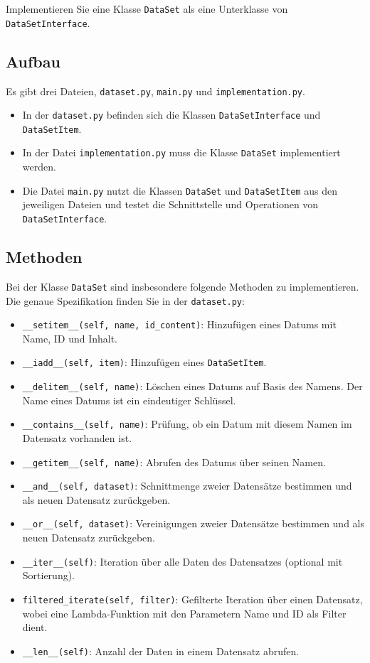 \documentclass[a4paper,12pt]{article}
\begin{document}
Implementieren Sie eine Klasse \texttt{DataSet} als eine Unterklasse von \texttt{DataSetInterface}.

\subsection{Aufbau}
Es gibt drei Dateien, \texttt{dataset.py}, \texttt{main.py} und \texttt{implementation.py}. 
\begin{itemize}
    \item In der \texttt{dataset.py} befinden sich die Klassen \texttt{DataSetInterface} und \texttt{DataSetItem}.
    \item In der Datei \texttt{implementation.py} muss die Klasse \texttt{DataSet} implementiert werden.
    \item Die Datei \texttt{main.py} nutzt die Klassen \texttt{DataSet} und \texttt{DataSetItem} aus den jeweiligen Dateien und testet die Schnittstelle und Operationen von \texttt{DataSetInterface}.
\end{itemize}

\subsection{Methoden}
Bei der Klasse \texttt{DataSet} sind insbesondere folgende Methoden zu implementieren. Die genaue Spezifikation finden Sie in der \texttt{dataset.py}:

\begin{itemize}
    \item \texttt{\_\_setitem\_\_(self, name, id\_content)}: Hinzufügen eines Datums mit Name, ID und Inhalt.
    \item \texttt{\_\_iadd\_\_(self, item)}: Hinzufügen eines \texttt{DataSetItem}.
    \item \texttt{\_\_delitem\_\_(self, name)}: Löschen eines Datums auf Basis des Namens. Der Name eines Datums ist ein eindeutiger Schlüssel.
    \item \texttt{\_\_contains\_\_(self, name)}: Prüfung, ob ein Datum mit diesem Namen im Datensatz vorhanden ist.
    \item \texttt{\_\_getitem\_\_(self, name)}: Abrufen des Datums über seinen Namen.
    \item \texttt{\_\_and\_\_(self, dataset)}: Schnittmenge zweier Datensätze bestimmen und als neuen Datensatz zurückgeben.
    \item \texttt{\_\_or\_\_(self, dataset)}: Vereinigungen zweier Datensätze bestimmen und als neuen Datensatz zurückgeben.
    \item \texttt{\_\_iter\_\_(self)}: Iteration über alle Daten des Datensatzes (optional mit Sortierung).
    \item \texttt{filtered\_iterate(self, filter)}: Gefilterte Iteration über einen Datensatz, wobei eine Lambda-Funktion mit den Parametern Name und ID als Filter dient.
    \item \texttt{\_\_len\_\_(self)}: Anzahl der Daten in einem Datensatz abrufen.
\end{itemize}
\end{document}

